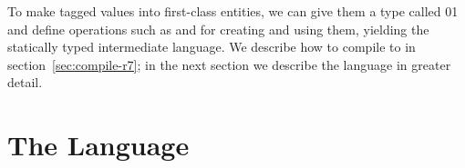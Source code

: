 \documentclass[7x10]{TimesAPriori_MIT}%
\def\racketEd{0}
\def\pythonEd{1}
\def\edition{1}
\newcommand{\racket}[1]{{\if\edition\racketEd{#1}\fi}}
\newcommand{\pythonColor}[0]{}
\newcommand{\python}[1]{{\if\edition\pythonEd\pythonColor #1\fi}}
\numberwithin{theorem}{chapter}
\numberwithin{definition}{chapter}
\numberwithin{equation}{chapter}
\begin{document}
To make tagged values into first-class entities, we can give them a
type called \racket{}\python{} and define
operations such as  and  for creating and
using them, yielding the statically typed \LangAny{} intermediate
language. We describe how to compile \LangDyn{} to \LangAny{} in
section~\ref{sec:compile-r7}; in the next section we describe the
\LangAny{} language in greater detail.

\section{The \LangAny{} Language}
\label{sec:Rany-lang}

\newcommand{\LanyASTRacket}{
\begin{array}{lcl}
\Type &::= & \ANYTY \\
\FType &::=& \key{Integer} \MID \key{Boolean} \MID \key{Void} 
      \MID \LP\key{Vector}\; \ANYTY\ldots\RP 
      \MID \LP\ANYTY\ldots \; \key{->}\; \ANYTY\RP\\
\itm{op} &::= & \code{any-vector-length}
     \MID \code{any-vector-ref} \MID \code{any-vector-set!}\\
    &\MID& \code{boolean?} \MID \code{integer?} \MID \code{vector?}
     \MID \code{procedure?} \MID \code{void?} \\
  \Exp &::=& \INJECT{\Exp}{\FType} \MID \PROJECT{\Exp}{\FType} 
\end{array}
}

\newcommand{\LanyASTPython}{
\begin{array}{lcl}
\Type &::= & \key{AnyType()} \\
\FType &::=& \key{IntType()} \MID \key{BoolType()} \MID \key{VoidType()}
  \MID \key{TupleType}\LS\key{AnyType()}^+\RS \\
  &\MID& \key{FunctionType}\LP \key{AnyType()}^{*}\key{, }\key{AnyType()}\RP \\
\Exp & ::= & \INJECT{\Exp}{\FType} \MID \PROJECT{\Exp}{\FType} \\
     &\MID& \CALL{\VAR{\skey{any\_tuple\_load}}}{\LS\Exp\key{, }\Exp\RS}\\
     &\MID& \CALL{\VAR{\skey{any\_len}}}{\LS\Exp\RS} \\
     &\MID& \CALL{\VAR{\skey{arity}}}{\LS\Exp\RS}  \\
     &\MID& \CALL{\VAR{\skey{make\_any}}}{\LS\Exp\key{, }\INT{\Int}\RS} 
\end{array}
}
\end{document}
